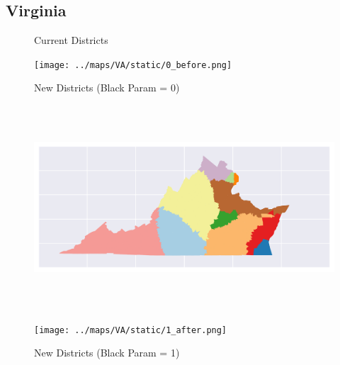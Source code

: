 \subsection{Virginia}
\begin{figure}[htb!] \centering
\caption{ Current Districts }
\texttt{[image: ../maps/VA/static/0\_before.png]}
\caption{ New Districts (Black Param = 0) }
\includegraphics[width=5in,height=3in,keepaspectratio]{../maps/VA/static/0_after.png}
\caption{ New Districts (Black Param = 1) }
\texttt{[image: ../maps/VA/static/1\_after.png]}
\end{figure}

\clearpage
\newpage

